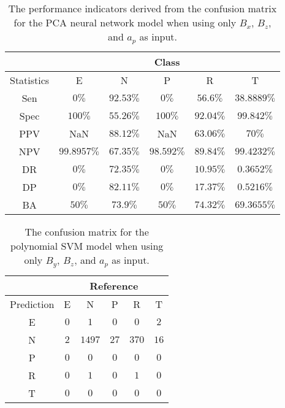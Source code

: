 \begin{table}[!ht]
	\centering
	\begin{tabular}{|c|c|c|c|c|c|}
		\hline
		 & \multicolumn{5}{c|}{Class} \\ \hline
		Statistics & E & N & P & R & T \\ \hline
		Sen & $0\%$ & $92.53\%$ & $0\%$ & $56.6\%$ & $38.8889\%$ \\ \hline
		Spec & $100\%$ & $55.26\%$ & $100\%$ & $92.04\%$ & $99.842\%$ \\ \hline
		PPV & NaN & $88.12\%$ & NaN & $63.06\%$ & $70\%$ \\ \hline
		NPV & $99.8957\%$ & $67.35\%$ & $98.592\%$ & $89.84\%$ & $99.4232\%$ \\ \hline
		DR & $0\%$ & $72.35\%$ & $0\%$ & $10.95\%$ & $0.3652\%$ \\ \hline
		DP & $0\%$ & $82.11\%$ & $0\%$ & $17.37\%$ & $0.5216\%$ \\ \hline
		BA & $50\%$ & $73.9\%$ & $50\%$ & $74.32\%$ & $69.3655\%$ \\ \hline
	\end{tabular}
	\caption{The performance indicators derived from the confusion matrix for the PCA neural network model when using only $B_{x}$, $B_{z}$, and $a_{p}$ as input.}
	\label{tab:cs:reverse:xzap:pcaNNet}
\end{table}

\begin{table}[!ht]
	\centering
	\begin{tabular}{|c|c|c|c|c|c|}
		\hline
		 & \multicolumn{5}{|c|}{Reference} \\ \hline
		 Prediction & E & N & P & R & T \\ \hline
		 E & $0$ & $1$ & $0$ & $0$ & $2$ \\ \hline
		 N & $2$ & $1497$ & $27$ & $370$ & $16$ \\ \hline
		 P & $0$ & $0$ & $0$ & $0$ & $0$ \\ \hline
		 R & $0$ & $1$ & $0$ & $1$ & $0$ \\ \hline
		 T & $0$ & $0$ & $0$ & $0$ & $0$ \\ \hline
	\end{tabular}
	\caption{The confusion matrix for the polynomial SVM model when using only $B_{y}$, $B_{z}$, and $a_{p}$ as input.}
	\label{tab:cm:yzap:svmPoly}
\end{table}

